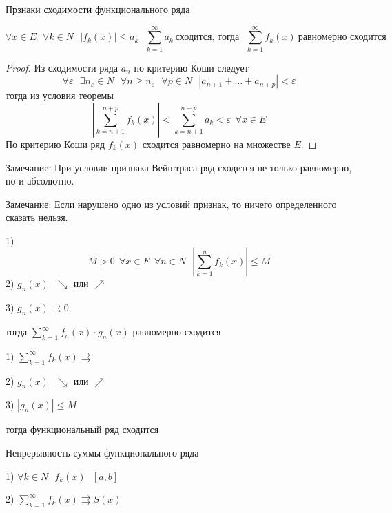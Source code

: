 \begin{title}
  Прзнаки сходимости функционального ряда
\end{title}

\begin{theorem}
  $$
  \forall x \in E ~~~ \forall k \in N ~~~ |f_k(x)| \le a_k ~~~
  \sum_{k=1}^{\infty}a_k ~ \text{сходится, тогда} ~~~
  \sum_{k=1}^{\infty} f_k (x) ~ \text{равномерно сходится}
  $$
\end{theorem}

\begin{proof}
  Из сходимости ряда $a_n$ по критерию Коши следует
  $$
  \forall \varepsilon ~~~ \exists n_{\varepsilon} \in N ~~~ \forall n \ge
  n_{\varepsilon} ~~~ \forall p \in N ~~~ |a_{n+1} + \ldots + a_{n+p}| <
  \varepsilon
  $$
  тогда из условия теоремы
  $$
  \left| \sum_{k = n + 1}^{n+p} f_k(x) \right| < \sum_{k = n+1}^{n+p} a_k <
  \varepsilon ~~ \forall x \in E
  $$
  По критерию Коши ряд $f_k(x)$ сходится равномерно на множестве $E$.
\end{proof}

Замечание: При условии признака Вейштраса ряд сходится не только равномерно, но
и абсолютно.

Замечание: Если нарушено одно из условий признак, то ничего определенного
сказать нельзя.

\begin{theorem}
  1)
  $$
  M > 0 ~~ \forall x \in E ~~ \forall n \in N ~~~
  \left| \sum_{k=1}^n f_k(x) \right| \le M
  $$
  2) $g_n(x) ~~~ \searrow$ или $\nearrow$

  3) $g_n(x) \rightrightarrows 0$

  тогда $\sum_{k=1}^{\infty} f_n(x) \cdot g_n(x)$ равномерно сходится
\end{theorem}


\begin{theorem}
  1) $\sum_{k=1}^{\infty} f_k(x) \rightrightarrows$

  2) $g_n(x) ~~~ \searrow$ или $\nearrow$

  3) $|g_n(x)| \le M$

  тогда функциональный ряд сходится
\end{theorem}

\begin{title}
  Непрерывность суммы функционального ряда
\end{title}

\begin{theorem}
  1) $\forall k \in N ~~~ f_k(x) ~~~ [a,b]$

  2) $\sum_{k=1}^{\infty} f_k (x) \rightrightarrows S(x)$
\end{theorem}

